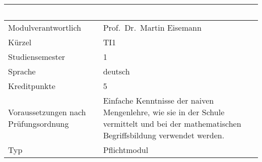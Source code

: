 \begin{longtable}[]{@{}ll@{}}
\toprule
\begin{minipage}[b]{0.12\columnwidth}\raggedright\strut
~\strut
\end{minipage} & \begin{minipage}[b]{0.12\columnwidth}\raggedright\strut
~\strut
\end{minipage}\tabularnewline
\midrule
\endhead
\begin{minipage}[t]{0.12\columnwidth}\raggedright\strut
Modulverantwortlich\strut
\end{minipage} & \begin{minipage}[t]{0.12\columnwidth}\raggedright\strut
Prof.~Dr.~Martin Eisemann\strut
\end{minipage}\tabularnewline
\begin{minipage}[t]{0.12\columnwidth}\raggedright\strut
Kürzel\strut
\end{minipage} & \begin{minipage}[t]{0.12\columnwidth}\raggedright\strut
TI1\strut
\end{minipage}\tabularnewline
\begin{minipage}[t]{0.12\columnwidth}\raggedright\strut
Studiensemester\strut
\end{minipage} & \begin{minipage}[t]{0.12\columnwidth}\raggedright\strut
1\strut
\end{minipage}\tabularnewline
\begin{minipage}[t]{0.12\columnwidth}\raggedright\strut
Sprache\strut
\end{minipage} & \begin{minipage}[t]{0.12\columnwidth}\raggedright\strut
deutsch\strut
\end{minipage}\tabularnewline
\begin{minipage}[t]{0.12\columnwidth}\raggedright\strut
Kreditpunkte\strut
\end{minipage} & \begin{minipage}[t]{0.12\columnwidth}\raggedright\strut
5\strut
\end{minipage}\tabularnewline
\begin{minipage}[t]{0.12\columnwidth}\raggedright\strut
Voraussetzungen nach Prüfungsordnung\strut
\end{minipage} & \begin{minipage}[t]{0.12\columnwidth}\raggedright\strut
Einfache Kenntnisse der naiven Mengenlehre, wie sie in der Schule
vermittelt und bei der mathematischen Begriffsbildung verwendet
werden.\strut
\end{minipage}\tabularnewline
\begin{minipage}[t]{0.12\columnwidth}\raggedright\strut
Typ\strut
\end{minipage} & \begin{minipage}[t]{0.12\columnwidth}\raggedright\strut
Pflichtmodul\strut
\end{minipage}\tabularnewline
\bottomrule
\end{longtable}

